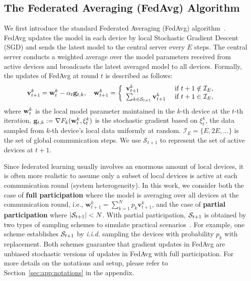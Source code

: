 \subsection{The Federated Averaging (FedAvg) Algorithm}
We first introduce the standard Federated Averaging (FedAvg) algorithm~\cite{mcmahan2016communication}.
FedAvg updates the model in each device by local Stochastic Gradient Descent (SGD) and sends the latest model to the central server every $E$
steps. The central server conducts a weighted average over the model parameters
received from active devices and broadcasts the latest averaged model to all devices.
Formally, the updates of FedAvg at round $t$ is described as follows:
\begin{align*} 
{\mathbf{v}}_{t+1}^{k} & ={\mathbf{w}}_{t}^{k}-\alpha_{t}{\mathbf{g}}_{t,k}, \hspace{1em}
\mathbf{w}_{t+1}^{k} =\left\{
\begin{array}{ll}
\mathbf{v}_{t+1}^{k} & \text { if } t+1 \notin \mathcal{I}_{E}, \\ 
\sum_{k \in {\mathcal{S}}_{t+1}} \mathbf{v}_{t+1}^{k} & \text { if } t+1 \in \mathcal{I}_{E},
\end{array}\right.
\end{align*}
where ${\mathbf{w}}_t^k$ is the local model parameter maintained in the $k$-th device at the $t$-th iteration, ${\mathbf{g}}_{t,k}:=\nabla F_{k}({\mathbf{w}}_{t}^{k},\xi_{t}^{k})$ is the stochastic gradient based on $\xi_{t}^{k}$, the data sampled from $k$-th device’s local data uniformly at random. $\mathcal{I}_{E}=\{E,2E,\dots\}$ is the set of global communication steps. We use $\mathcal{S}_{t+1}$ to represent the set of active devices at $t+1$.

Since federated learning usually involves an enormous amount of 
local devices, it is often more realistic to assume only a subset of 
local devices is active at each communication round (system heterogeneity). In this work,
we consider both the case of \textbf{full participation} where the model is
averaging over all devices at the communication round, i.e.,
$\mathbf{w}_{t+1}^{k} = \sum_{k=1}^N p_k \mathbf{v}_{t+1}^{k}$, and
the case of \textbf{partial participation} where $|{\mathcal{S}}_{t+1}| < N$. 
With partial participation, ${\mathcal{S}}_{t+1}$ is obtained by two types of
sampling schemes to simulate practical scenarios~\cite{li2019convergence}. For example, one scheme establishes ${\mathcal{S}}_{t+1}$ by \emph{i.i.d.} sampling the devices with probability $p_k$ with replacement. 
Both schemes
guarantee that gradient updates in FedAvg are unbiased stochastic versions of
updates in FedAvg with full participation. For 
more details on the notations and setup, please refer to Section~\ref{sec:app:notations} in the appendix.

